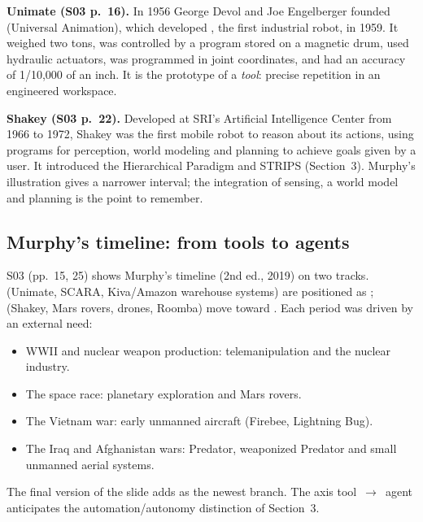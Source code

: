 \textbf{Unimate (S03 p.~16).} In 1956 George Devol and Joe Engelberger founded  (Universal Animation), which developed , the first industrial robot, in 1959. It weighed two tons, was controlled by a program stored on a magnetic drum, used hydraulic actuators, was programmed in joint coordinates, and had an accuracy of 1/10,000 of an inch. It is the prototype of a \emph{tool}: precise repetition in an engineered workspace.

\textbf{Shakey (S03 p.~22).} Developed at SRI's Artificial Intelligence Center from 1966 to 1972, Shakey was the first mobile robot to reason about its actions, using programs for perception, world modeling and planning to achieve goals given by a user. It introduced the Hierarchical Paradigm and STRIPS (Section~3). Murphy's illustration gives a narrower interval; the integration of sensing, a world model and planning is the point to remember.

\subsection{Murphy's timeline: from tools to agents}
S03 (pp.~15, 25) shows Murphy's timeline (2nd ed., 2019) on two tracks.  (Unimate, SCARA, Kiva/Amazon warehouse systems) are positioned as ;  (Shakey, Mars rovers, drones, Roomba) move toward . Each period was driven by an external need:
\begin{itemize}
\item WWII and nuclear weapon production: telemanipulation and the nuclear industry.
\item The space race: planetary exploration and Mars rovers.
\item The Vietnam war: early unmanned aircraft (Firebee, Lightning Bug).
\item The Iraq and Afghanistan wars: Predator, weaponized Predator and small unmanned aerial systems.
\end{itemize}
The final version of the slide adds  as the newest branch. The axis tool~$\rightarrow$~agent anticipates the automation/autonomy distinction of Section~3.

